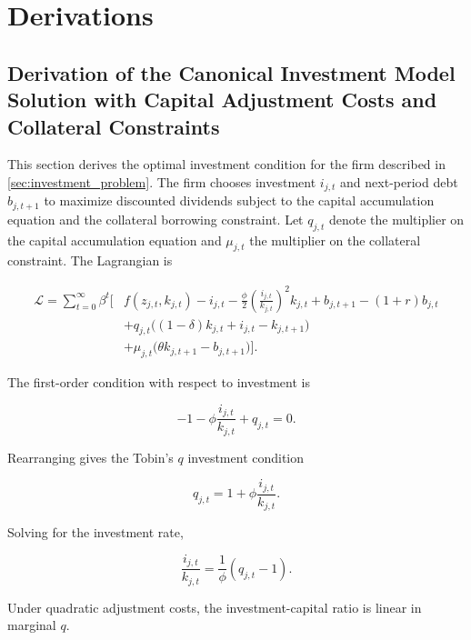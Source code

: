 \section{Derivations} \label{sec:appendix_a}

\subsection{Derivation of the Canonical Investment Model Solution with Capital Adjustment Costs and Collateral Constraints}
\label{app:canonical-investment-derivation}

This section derives the optimal investment condition for the firm described in
\ref{sec:investment_problem}. The firm chooses investment $i_{j,t}$ and
next-period debt $b_{j,t+1}$ to maximize discounted dividends subject to the
capital accumulation equation and the collateral borrowing constraint.
Let $q_{j,t}$ denote the multiplier on the capital accumulation equation and
$\mu_{j,t}$ the multiplier on the collateral constraint. The Lagrangian is

\begin{align}
\mathcal{L} = \sum_{t=0}^{\infty} \beta^t \Big[
& f(z_{j,t},k_{j,t}) - i_{j,t}
- \frac{\phi}{2}\left(\frac{i_{j,t}}{k_{j,t}}\right)^2 k_{j,t}
+ b_{j,t+1} - (1+r)b_{j,t} \\
& + q_{j,t}\big((1-\delta)k_{j,t} + i_{j,t} - k_{j,t+1}\big) \\
& + \mu_{j,t}\big(\theta k_{j,t+1} - b_{j,t+1}\big)
\Big].
\end{align}

The first-order condition with respect to investment is

\begin{equation}
-1 - \phi \frac{i_{j,t}}{k_{j,t}} + q_{j,t} = 0 .
\end{equation}

Rearranging gives the Tobin's $q$ investment condition

\begin{equation}
q_{j,t} = 1 + \phi \frac{i_{j,t}}{k_{j,t}} .
\end{equation}

Solving for the investment rate,

\begin{equation}
\frac{i_{j,t}}{k_{j,t}} = \frac{1}{\phi}(q_{j,t}-1).
\end{equation}

Under quadratic adjustment costs, the investment-capital ratio is linear in marginal $q$.

